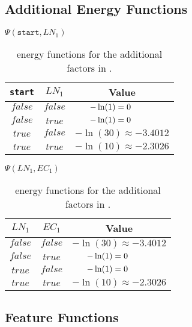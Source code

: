\subsection{Additional Energy Functions}\label{app:subsec-lccrf-additional-energy-functions}
\begin{table}[H]
\begin{minipage}{0.5\linewidth}
\centering
$\Psi(\texttt{start},LN_1)$\par
\smallskip
\begin{tabular}{c c c}
 \toprule
 \texttt{start} & $LN_1$ & Value \\
 \midrule
 $\mathit{false}$ & $\mathit{false}$ & $-\ln(1) = 0\hphantom{.00001}$ \\
 $\mathit{false}$ & $\mathit{true}$ & $-\ln(1) = 0\hphantom{.00001}$ \\
 $\mathit{true}$ & $\mathit{false}$ & $-\ln(30)\approx-3.4012$ \\
 $\mathit{true}$ & $\mathit{true}$ & $-\ln(10)\approx-2.3026$ \\
 \bottomrule
\end{tabular}
\end{minipage}
\hfill
\begin{minipage}{0.5\linewidth}
\centering
$\Psi(LN_1,EC_1)$\par
\smallskip
\begin{tabular}{c c c}
 \toprule
 $LN_1$ & $EC_1$ & Value \\
 \midrule
 $\mathit{false}$ & $\mathit{false}$ & $-\ln(30)\approx-3.4012$ \\
 $\mathit{false}$ & $\mathit{true}$ & $-\ln(1) = 0\hphantom{.00001}$ \\
 $\mathit{true}$ & $\mathit{false}$ & $-\ln(1) = 0\hphantom{.00001}$ \\
 $\mathit{true}$ & $\mathit{true}$ & $-\ln(10)\approx-2.3026$ \\
 \bottomrule
\end{tabular}
\end{minipage}
\caption{\Glspl{energy function} for the additional \glspl{factor} in .}
\label{tab:example-linear-chain-crf-energy-functions}
\end{table}

\subsection{Feature Functions}\label{app:subsec-lccrf-feature-functions}

